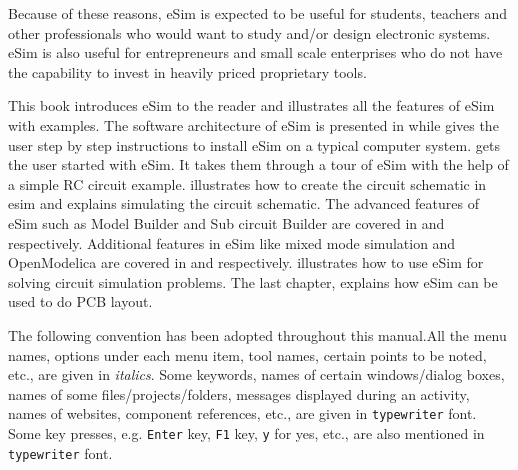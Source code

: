 Because of these reasons, eSim is expected to be useful for
students, teachers and other professionals who would want to study
and/or design electronic systems.  eSim is also useful for
entrepreneurs and small scale enterprises who do not have the
capability to invest in heavily priced proprietary tools.

This book introduces eSim to the reader and illustrates all the
features of eSim with examples. The software architecture of eSim is
presented in  while  gives the user step 
by step instructions to install eSim on a typical computer system. 
 gets the user started with eSim. It takes them through 
a tour of eSim with the help of a simple RC circuit example. 
 illustrates how to create the circuit schematic in esim 
and  explains simulating the circuit schematic. The 
advanced features of eSim such as Model Builder and Sub circuit Builder 
are covered in  and  respectively. 
Additional features in eSim like mixed mode simulation and 
OpenModelica are covered in  and  
respectively.  illustrates how to use eSim for solving 
circuit simulation problems. The last chapter,  explains 
how eSim can be used to do PCB layout.

The following convention has been adopted throughout this manual.All
the menu names, options under each menu item, tool names, certain
points to be noted, etc., are given in \textit{italics}.  Some
keywords, names of certain windows/dialog boxes, names of some
files/projects/folders, messages displayed during an activity, names
of websites, component references, etc., are given in {\tt typewriter}
font. Some key presses, e.g. {\tt Enter} key, {\tt F1} key, {\tt y}
for yes, etc., are also mentioned in {\tt typewriter} font.
